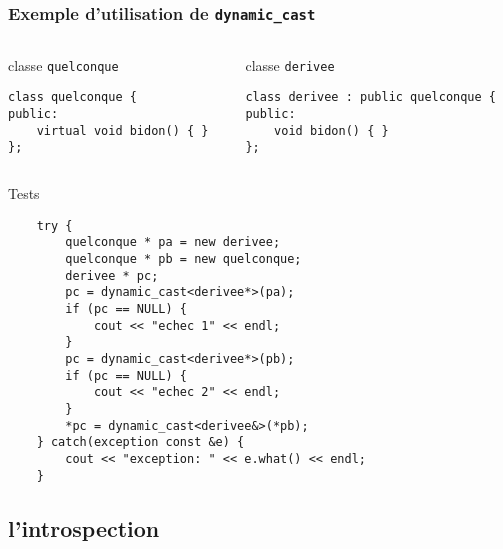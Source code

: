 \begin{frame}[fragile]
\frametitle{Exemple d'utilisation de \texttt{dynamic\_cast}}
\begin{columns}
\begin{column}{.48\textwidth}
\begin{codeblock}{classe \texttt{quelconque}}
\begin{lstlisting}
class quelconque {
public:
    virtual void bidon() { }
};
\end{lstlisting}
\end{codeblock}
\end{column}
\begin{column}{.48\textwidth}
\begin{codeblock}{classe \texttt{derivee}}
\begin{lstlisting}
class derivee : public quelconque {
public:
    void bidon() { }
};
\end{lstlisting}
\end{codeblock}
\end{column}
\end{columns}
\begin{codeblock}{Tests}
\begin{lstlisting}
    try {
        quelconque * pa = new derivee;
        quelconque * pb = new quelconque;
        derivee * pc;
        pc = dynamic_cast<derivee*>(pa);
        if (pc == NULL) {
            cout << "echec 1" << endl;
        }
        pc = dynamic_cast<derivee*>(pb);
        if (pc == NULL) {
            cout << "echec 2" << endl;
        }
        *pc = dynamic_cast<derivee&>(*pb);
    } catch(exception const &e) {
        cout << "exception: " << e.what() << endl;
    }
\end{lstlisting}
\end{codeblock}
\end{frame}

\subsection{l'introspection}
\label{sec:typeid}

